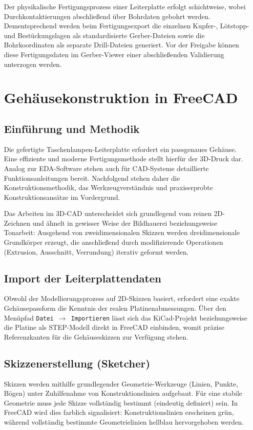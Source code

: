 Der physikalische Fertigungsprozess einer Leiterplatte erfolgt schichtweise, wobei Durchkontaktierungen abschließend über Bohrdaten gebohrt werden. Dementsprechend werden beim Fertigungsexport die einzelnen Kupfer-, Lötstopp- und Bestückungslagen als standardisierte Gerber-Dateien sowie die Bohrkoordinaten als separate Drill-Dateien generiert. Vor der Freigabe können diese Fertigungsdaten im Gerber-Viewer einer abschließenden Validierung unterzogen werden.

\chapter{Gehäusekonstruktion in FreeCAD}

\section{Einführung und Methodik}
Die gefertigte Taschenlampen-Leiterplatte erfordert ein passgenaues Gehäuse. Eine effiziente und moderne Fertigungsmethode stellt hierfür der 3D-Druck dar. Analog zur EDA-Software stehen auch für CAD-Systeme detaillierte Funktionsanleitungen bereit. Nachfolgend stehen daher die Konstruktionsmethodik, das Werkzeugverständnis und praxiserprobte Konstruktionsansätze im Vordergrund.

Das Arbeiten im 3D-CAD unterscheidet sich grundlegend vom reinen 2D-Zeichnen und ähnelt in gewisser Weise der Bildhauerei beziehungsweise Tonarbeit: Ausgehend von zweidimensionalen Skizzen werden dreidimensionale Grundkörper erzeugt, die anschließend durch modifizierende Operationen (Extrusion, Ausschnitt, Verrundung) iterativ geformt werden.

\section{Import der Leiterplattendaten}
Obwohl der Modellierungsprozess auf 2D-Skizzen basiert, erfordert eine exakte Gehäusepassform die Kenntnis der realen Platinenabmessungen. Über den Menüpfad \texttt{Datei $\rightarrow$ Importieren} lässt sich das KiCad-Projekt beziehungsweise die Platine als STEP-Modell direkt in FreeCAD einbinden, womit präzise Referenzkanten für die Gehäuseskizzen zur Verfügung stehen.

\section{Skizzenerstellung (Sketcher)}
Skizzen werden mithilfe grundlegender Geometrie-Werkzeuge (Linien, Punkte, Bögen) unter Zuhilfenahme von Konstruktionslinien aufgebaut. Für eine stabile Geometrie muss jede Skizze vollständig bestimmt (eindeutig definiert) sein. In FreeCAD wird dies farblich signalisiert: Konstruktionslinien erscheinen grün, während vollständig bestimmte Geometrielinien hellblau hervorgehoben werden.

